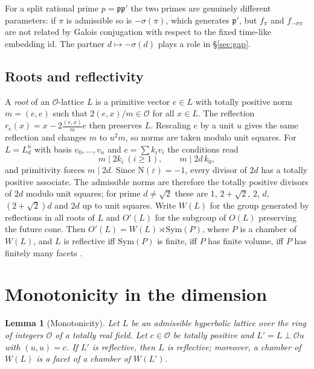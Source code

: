 \documentclass[11pt]{amsart}
\newtheorem{lemma}[theorem]{Lemma}
\theoremstyle{definition}
\newcommand{\OK}{\mathcal{O}}
\newcommand{\eps}{\varepsilon}
\newcommand{\id}{\mathrm{id}}
\newcommand{\N}{\mathrm{N}}
\begin{document}
For a split rational prime $p=\mathfrak p\mathfrak p'$ the two primes are genuinely different
parameters: if $\pi$ is admissible so is $-\sigma(\pi)$, which generates $\mathfrak p'$, but
$f_\pi$ and $f_{-\sigma\pi}$ are not related by Galois conjugation with respect to the fixed
time-like embedding $\id$. The partner $d\mapsto -\sigma(d)$ plays a role in \S\ref{sec:gap}.

\subsection{Roots and reflectivity}
A \emph{root} of an $\OK$-lattice $L$ is a primitive vector $e\in L$ with totally positive
norm $m=(e,e)$ such that $2(e,x)/m\in\OK$ for all $x\in L$. The reflection
$r_e(x)=x-2\frac{(e,x)}{m}e$ then preserves $L$. Rescaling $e$ by a unit $u$ gives the same
reflection and changes $m$ to $u^2m$, so norms are taken modulo unit squares. For
$L=L_d^n$ with basis $v_0,\dots,v_n$ and $e=\sum k_iv_i$ the conditions read
\[
  m\mid 2k_i\ (i\ge1),\qquad m\mid 2d\,k_0 ,
\]
and primitivity forces $m\mid 2d$. Since $\N(\eps)=-1$, every divisor of $2d$ has a totally
positive associate. The admissible norms are therefore the totally positive divisors of $2d$
modulo unit squares; for prime $d\ne\sqrt2$ these are $1$, $2+\sqrt2$, $2$, $d$,
$(2+\sqrt2)d$ and $2d$ up to unit squares. Write $W(L)$ for the group generated by
reflections in all roots of $L$ and $O'(L)$ for the subgroup of $O(L)$ preserving the future
cone. Then $O'(L)=W(L)\rtimes\mathrm{Sym}(P)$, where $P$ is a chamber of $W(L)$, and $L$ is
reflective iff $\mathrm{Sym}(P)$ is finite, iff $P$ has finite volume, iff $P$ has finitely
many facets \cite{Vin72}.

\section{Monotonicity in the dimension}\label{sec:mono}

\begin{lemma}[Monotonicity]\label{lem:mono}
Let $L$ be an admissible hyperbolic lattice over the ring of integers $\OK$ of a totally real
field. Let $c\in\OK$ be totally positive and $L'=L\perp\OK u$ with $(u,u)=c$. If $L'$ is
reflective, then $L$ is reflective; moreover, a chamber of $W(L)$ is a facet of a chamber of
$W(L')$.
\end{lemma}
\end{document}
